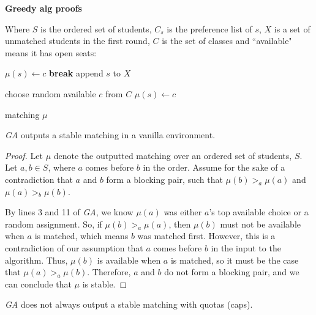 
\textbf{Greedy alg proofs}

Where $S$ is the ordered set of students, $C_s$ is the preference list of $s$,
$X$ is a set of unmatched students in the first round, $C$ is the set of classes
and ``available" means it has open seats:

\begin{algorithm}
  \caption{Greedy Algorithm (\textit{GA})}
  \begin{algorithmic}[1]     \State $\mu(s) \gets
      c$ \State \textbf{break}   \EndIf \EndFor  \State append $s$ to $X$ \EndFor

      \State choose
    random available $c$ from $C$ \State $\mu(s) \gets c$ \EndFor

    \State \Return matching $\mu$
  \end{algorithmic}
\end{algorithm}

\begin{theorem}
  \textit{GA} outputs a stable matching in a vanilla
  environment.
\end{theorem}

\begin{proof}
  Let $\mu$ denote the outputted matching over an ordered set of
  students, $S$. Let $a, b \in S$, where $a$ comes before $b$ in the order.
  Assume for the sake of a contradiction that $a$ and $b$ form a blocking
  pair, such that $\mu(b) >_a \mu(a)$ and $\mu(a) >_b \mu(b)$.

  By lines 3 and 11 of \textit{GA}, we know $\mu(a)$ was either $a$'s top
  available choice or  a random assignment. So, if $\mu(b) >_a \mu(a)$, then
  $\mu(b)$ must not be available when $a$ is matched, which means $b$ was
  matched first. However, this is a contradiction of our assumption that $a$
  comes before $b$ in the input to the algorithm. Thus, $\mu(b)$ is available
  when $a$ is matched, so it must be the case that $\mu(a) >_a \mu(b)$.
  Therefore, $a$ and $b$ do not form a blocking pair, and we can conclude that
  $\mu$ is stable.
\end{proof}

\begin{theorem}
  \textit{GA} does not always output a stable matching with
  quotas (caps).
\end{theorem}

